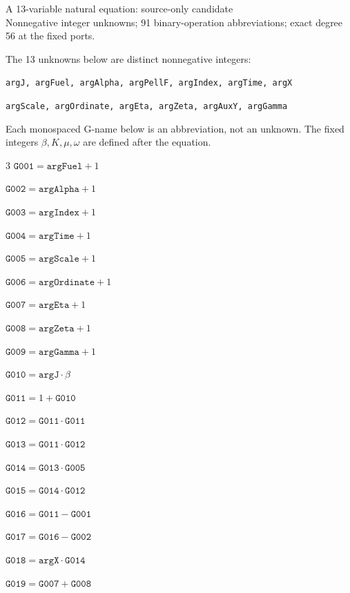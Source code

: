 \documentclass[10pt]{article}
\begin{document}
\begin{center}{\Large A 13-variable natural equation: source-only candidate}\\
Nonnegative integer unknowns; 91 binary-operation abbreviations; exact degree 56 at the fixed ports.
\end{center}
The 13 unknowns below are distinct nonnegative integers:
\par\small
\noindent\texttt{argJ, argFuel, argAlpha, argPellF, argIndex, argTime, argX}\par
\noindent\texttt{argScale, argOrdinate, argEta, argZeta, argAuxY, argGamma}\par
\normalsize
Each monospaced G-name below is an abbreviation, not an unknown. The fixed integers $\beta,K,\mu,\omega$ are defined after the equation.
\begin{multicols}{3}\small
\noindent $\mathtt{G001}=\mathtt{argFuel}+1$\par
\noindent $\mathtt{G002}=\mathtt{argAlpha}+1$\par
\noindent $\mathtt{G003}=\mathtt{argIndex}+1$\par
\noindent $\mathtt{G004}=\mathtt{argTime}+1$\par
\noindent $\mathtt{G005}=\mathtt{argScale}+1$\par
\noindent $\mathtt{G006}=\mathtt{argOrdinate}+1$\par
\noindent $\mathtt{G007}=\mathtt{argEta}+1$\par
\noindent $\mathtt{G008}=\mathtt{argZeta}+1$\par
\noindent $\mathtt{G009}=\mathtt{argGamma}+1$\par
\noindent $\mathtt{G010}=\mathtt{argJ}\cdot \beta$\par
\noindent $\mathtt{G011}=1+\mathtt{G010}$\par
\noindent $\mathtt{G012}=\mathtt{G011}\cdot \mathtt{G011}$\par
\noindent $\mathtt{G013}=\mathtt{G011}\cdot \mathtt{G012}$\par
\noindent $\mathtt{G014}=\mathtt{G013}\cdot \mathtt{G005}$\par
\noindent $\mathtt{G015}=\mathtt{G014}\cdot \mathtt{G012}$\par
\noindent $\mathtt{G016}=\mathtt{G011}-\mathtt{G001}$\par
\noindent $\mathtt{G017}=\mathtt{G016}-\mathtt{G002}$\par
\noindent $\mathtt{G018}=\mathtt{argX}\cdot \mathtt{G014}$\par
\noindent $\mathtt{G019}=\mathtt{G007}+\mathtt{G008}$\par

\end{multicols}
\end{document}
